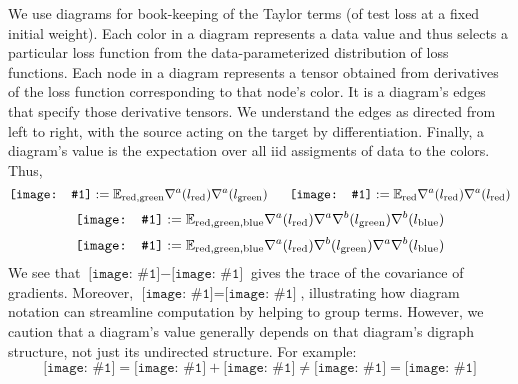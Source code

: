 \documentclass[12pt]{article}
\newcommand{\dia}[1]{\texttt{[image: \#1]}}
\begin{document}
            We use diagrams for book-keeping of the Taylor terms (of test loss at a fixed initial weight). 
            Each color in a diagram represents a data value and thus selects a particular loss function from the
            data-parameterized distribution of loss functions.  Each node in a diagram represents a tensor obtained from
            derivatives of the loss function corresponding to that node's color.  It is a diagram's edges that
            specify those derivative tensors.  We understand the edges as directed from left to right, with the source
            acting on the target by differentiation.  Finally, a diagram's value is the expectation over all iid assigments
            of data to the colors.  Thus,
            $$
                \dia{rg} := \expec_{\text{red},\text{green}} \nabla^a(l_{\text{red}}) \nabla^a(l_{\text{green}})
                ~~~~~
                \dia{rr} := \expec_{\text{red}} \nabla^a(l_{\text{red}}) \nabla^a(l_{\text{red}})
            $$
            $$
                \dia{rgb} := \expec_{\text{red},\text{green},\text{blue}} \nabla^a(l_{\text{red}}) \nabla^a \nabla^b(l_{\text{green}}) \nabla^b(l_{\text{blue}})
            $$
            $$
                \dia{sgd-2b} := \expec_{\text{red},\text{green},\text{blue}} \nabla^a(l_{\text{red}}) \nabla^b(l_{\text{green}}) \nabla^a \nabla^b(l_{\text{blue}})
            $$
            We see that $\dia{rr}-\dia{rg}$ gives the trace of the covariance of gradients.
            Moreover, $\dia{sgd-2a} = \dia{sgd-2b}$, illustrating how diagram notation can streamline computation by
            helping to group terms.  However, we caution that a diagram's value generally depends on that diagram's digraph 
            structure, not just its undirected structure.  For example:  
            $$
                \dia{rggb} = \dia{rggb-a} + \dia{rggb-b} \neq \dia{rrgb-a} = \dia{rrgb} 
            $$
\end{document}
